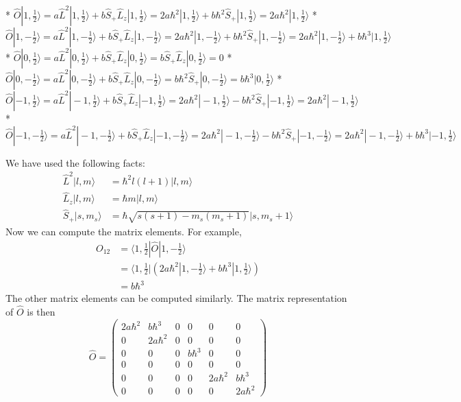 \documentclass{article}
\begin{document}
* $\hat{O} |1, \frac{1}{2}\rangle = a \hat{L}^2 |1, \frac{1}{2}\rangle + b \hat{S}_+ \hat{L}_z |1, \frac{1}{2}\rangle = 2a\hbar^2 |1, \frac{1}{2}\rangle + b \hbar^2 \hat{S}_+ |1, \frac{1}{2}\rangle = 2a\hbar^2 |1, \frac{1}{2}\rangle$ 
* $\hat{O} |1, -\frac{1}{2}\rangle = a \hat{L}^2 |1, -\frac{1}{2}\rangle + b \hat{S}_+ \hat{L}_z |1, -\frac{1}{2}\rangle = 2a\hbar^2 |1, -\frac{1}{2}\rangle + b \hbar^2 \hat{S}_+ |1, -\frac{1}{2}\rangle = 2a\hbar^2 |1, -\frac{1}{2}\rangle + b\hbar^3 |1, \frac{1}{2}\rangle$
* $\hat{O} |0, \frac{1}{2}\rangle = a \hat{L}^2 |0, \frac{1}{2}\rangle + b \hat{S}_+ \hat{L}_z |0, \frac{1}{2}\rangle =  b \hat{S}_+ \hat{L}_z |0, \frac{1}{2}\rangle = 0$
* $\hat{O} |0, -\frac{1}{2}\rangle = a \hat{L}^2 |0, -\frac{1}{2}\rangle + b \hat{S}_+ \hat{L}_z |0, -\frac{1}{2}\rangle = b\hbar^2 \hat{S}_+ |0, -\frac{1}{2}\rangle = b\hbar^3 |0, \frac{1}{2}\rangle$
* $\hat{O} |-1, \frac{1}{2}\rangle = a \hat{L}^2 |-1, \frac{1}{2}\rangle + b \hat{S}_+ \hat{L}_z |-1, \frac{1}{2}\rangle = 2a\hbar^2 |-1, \frac{1}{2}\rangle - b\hbar^2 \hat{S}_+ |-1, \frac{1}{2}\rangle = 2a\hbar^2 |-1, \frac{1}{2}\rangle$
* $\hat{O} |-1, -\frac{1}{2}\rangle = a \hat{L}^2 |-1, -\frac{1}{2}\rangle + b \hat{S}_+ \hat{L}_z |-1, -\frac{1}{2}\rangle = 2a\hbar^2 |-1, -\frac{1}{2}\rangle - b\hbar^2 \hat{S}_+ |-1, -\frac{1}{2}\rangle = 2a\hbar^2 |-1, -\frac{1}{2}\rangle + b\hbar^3 |-1, \frac{1}{2}\rangle$

We have used the following facts:
\begin{align*}
\hat{L}^2 |l, m\rangle &= \hbar^2 l(l+1) |l, m\rangle \\
\hat{L}_z |l, m\rangle &= \hbar m |l, m\rangle \\
\hat{S}_+ |s, m_s\rangle &= \hbar \sqrt{s(s+1) - m_s(m_s + 1)} |s, m_s + 1\rangle
\end{align*}
Now we can compute the matrix elements.  For example,
\begin{align*}
O_{12} &= \langle 1, \frac{1}{2} | \hat{O} | 1, -\frac{1}{2} \rangle \\
&= \langle 1, \frac{1}{2} | \left( 2a\hbar^2 |1, -\frac{1}{2}\rangle + b\hbar^3 |1, \frac{1}{2}\rangle \right) \\
&= b\hbar^3
\end{align*}
The other matrix elements can be computed similarly.  The matrix representation of $\hat{O}$ is then
\[
\hat{O} = \begin{pmatrix}
2a\hbar^2 & b\hbar^3 & 0 & 0 & 0 & 0 \\
0 & 2a\hbar^2 & 0 & 0 & 0 & 0 \\
0 & 0 & 0 & b\hbar^3 & 0 & 0 \\
0 & 0 & 0 & 0 & 0 & 0 \\
0 & 0 & 0 & 0 & 2a\hbar^2 & b\hbar^3 \\
0 & 0 & 0 & 0 & 0 & 2a\hbar^2
\end{pmatrix}
\]
\end{document}
